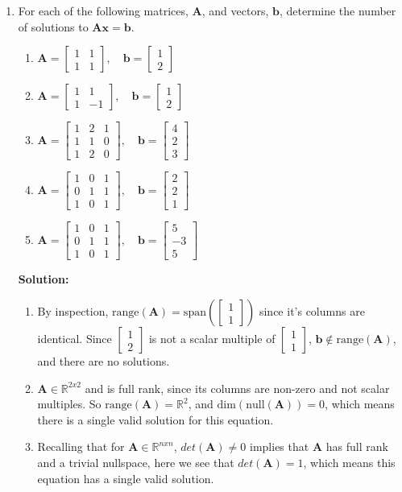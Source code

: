 \documentclass[]{article}
\newcommand{\R}{\mathbb{R}}				%
\newcommand{\bbm}{\begin{bmatrix}}		%
\newcommand{\ebm}{\end{bmatrix}}		%
\newcommand{\x}{\bm{x}}					%
\newcommand{\A}{\bm{A}}					%
\newcommand{\vspan}{\mathrm{span}}		%
\newcommand{\vrange}{\mathrm{range}}		%
\newcommand{\vdim}{\mathrm{dim}}		%
\newcommand{\vnull}{\mathrm{null}}		%
\newcommand{\solution}{\vskip 0.5cm \textbf{\large Solution:} \\}
\begin{document}
\begin{enumerate}[resume]
	\item For each of the following matrices, $\A$, and vectors, $\bm{b}$, determine the number of solutions to $\A\x=\bm{b}$.
	  \begin{enumerate}
	  \item $\A = \bbm 1&1\\1&1 \ebm,\quad \bm{b}=\bbm 1\\2\ebm$
	  \item $\A = \bbm 1&1\\1&-1\ebm,\quad \bm{b}=\bbm 1\\2\ebm$
	  \item $\A = \bbm 1 & 2 & 1 \\ 1&1&0\\1&2&0 \ebm,\quad \bm{b}=\bbm 4\\2\\3 \ebm$
	  \item $\A = \bbm 1&0&1\\0&1&1\\1&0&1 \ebm,\quad \bm{b}=\bbm 2\\2\\1 \ebm$
	  \item $\A = \bbm 1&0&1\\0&1&1\\1&0&1 \ebm,\quad \bm{b}=\bbm 5\\-3\\5 \ebm$
	  \end{enumerate}

	  \solution
	  \begin{enumerate}
	  \item By inspection, $\vrange(\A) = \vspan\left(\bbm 1 \\ 1 \ebm\right)$ since
        it's columns are identical. Since $\bbm 1 \\ 2 \ebm$ is not a
        scalar multiple of $\bbm 1 \\ 1 \ebm$, $\bm{b} \not\in
        \vrange(\A)$, and there are no solutions.

      \item $\A \in \R^{2x2}$ and is full rank, since its columns are
        non-zero and not scalar multiples. So $\vrange(\A) = \R^{2}$,
        and $\vdim(\vnull(\A)) = 0$, which means there is a single valid
        solution for this equation.

      \item Recalling that for $\A \in \R^{nxn}$, $det(\A) \neq 0$
        implies that $\A$ has full rank and a trivial nullspace, here
        we see that $det(\A) = 1$, which means this equation has a
        single valid solution.


\end{enumerate}
\end{enumerate}
\end{document}
